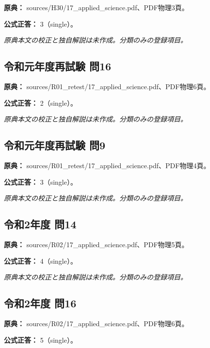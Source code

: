 \noindent\textbf{原典：} sources/H30/17\_applied\_science.pdf、PDF物理3頁。

\textbf{公式正答：} 3（single）。

\par\textit{原典本文の校正と独自解説は未作成。分類のみの登録項目。}

\subsection{令和元年度再試験 問16}
\label{q:r01-ret-applied-16}

\noindent\textbf{原典：} sources/R01\_retest/17\_applied\_science.pdf、PDF物理6頁。

\textbf{公式正答：} 2（single）。

\par\textit{原典本文の校正と独自解説は未作成。分類のみの登録項目。}

\subsection{令和元年度再試験 問9}
\label{q:r01-ret-applied-09}

\noindent\textbf{原典：} sources/R01\_retest/17\_applied\_science.pdf、PDF物理4頁。

\textbf{公式正答：} 3（single）。

\par\textit{原典本文の校正と独自解説は未作成。分類のみの登録項目。}

\subsection{令和2年度 問14}
\label{q:r02-reg-applied-14}

\noindent\textbf{原典：} sources/R02/17\_applied\_science.pdf、PDF物理5頁。

\textbf{公式正答：} 4（single）。

\par\textit{原典本文の校正と独自解説は未作成。分類のみの登録項目。}

\subsection{令和2年度 問16}
\label{q:r02-reg-applied-16}

\noindent\textbf{原典：} sources/R02/17\_applied\_science.pdf、PDF物理6頁。

\textbf{公式正答：} 5（single）。

